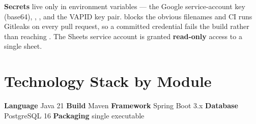 \documentclass[10pt,a4paper]{article}
\begin{document}
\textbf{Secrets} live only in environment variables --- the Google service-account key (base64),
, , and the VAPID key pair.  blocks the
obvious filenames and CI runs Gitleaks on every pull request, so a committed credential fails the
build rather than reaching . The Sheets service account is granted \textbf{read-only}
access to a single sheet.

\section{Technology Stack by Module}

\textbf{Language} Java 21 \quad\textbullet\quad \textbf{Build} Maven \quad\textbullet\quad
\textbf{Framework} Spring Boot 3.x \quad\textbullet\quad \textbf{Database} PostgreSQL 16
\quad\textbullet\quad \textbf{Packaging} single executable 
\end{document}
